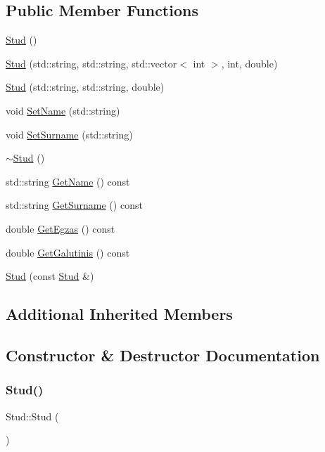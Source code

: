 \subsection*{Public Member Functions}
\begin{DoxyCompactItemize}
\item 
\mbox{\hyperlink{class_stud_a97585839898d45dc9fc815d5b36e2b69}{Stud}} ()
\item 
\mbox{\hyperlink{class_stud_a744806d8e1621836bb252fcc6a34ae48}{Stud}} (std\+::string, std\+::string, std\+::vector$<$ int $>$, int, double)
\item 
\mbox{\hyperlink{class_stud_aa76fa97deb4f1e2720fe7f6e423650e4}{Stud}} (std\+::string, std\+::string, double)
\item 
void \mbox{\hyperlink{class_stud_a47072e741fc0f089a5412e0a0b74c2a2}{Set\+Name}} (std\+::string)
\item 
void \mbox{\hyperlink{class_stud_aaf24cd5a22fea522b6f9da7e3a994d99}{Set\+Surname}} (std\+::string)
\item 
\mbox{\hyperlink{class_stud_aa1c38d670d1f269ebd48588c40ad58db}{$\sim$\+Stud}} ()
\item 
std\+::string \mbox{\hyperlink{class_stud_ad500475ff8e68c9d52db885bdf16937b}{Get\+Name}} () const
\item 
std\+::string \mbox{\hyperlink{class_stud_a832e44b522edd983fde7f6f6b78080f5}{Get\+Surname}} () const
\item 
double \mbox{\hyperlink{class_stud_a79cce5ddc342ad67ff5ce46254faa408}{Get\+Egzas}} () const
\item 
double \mbox{\hyperlink{class_stud_ae6e584f68200c6c325e40b0a74b8cf40}{Get\+Galutinis}} () const
\item 
\mbox{\hyperlink{class_stud_a6214e752d5e514ed77ab875e3ab5b47c}{Stud}} (const \mbox{\hyperlink{class_stud}{Stud}} \&)
\end{DoxyCompactItemize}
\subsection*{Additional Inherited Members}


\subsection{Constructor \& Destructor Documentation}
\mbox{\label{class_stud_a97585839898d45dc9fc815d5b36e2b69}} 
\subsubsection{\texorpdfstring{Stud()}{Stud()}\hspace{0.1cm}{\footnotesize\ttfamily [1/4]}}
{\footnotesize\ttfamily Stud\+::\+Stud (\begin{DoxyParamCaption}{ }\end{DoxyParamCaption})}

